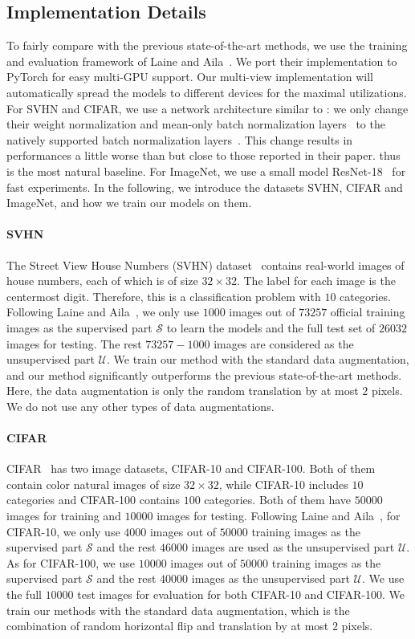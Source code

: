 \documentclass[runningheads]{llncs}
\begin{document}
\subsection{Implementation Details}
To fairly compare with the previous state-of-the-art methods, we use the training and evaluation framework of Laine and Aila~\cite{tessl}.
We port their implementation to PyTorch for easy multi-GPU support.
Our multi-view implementation will automatically spread the models to different devices for the maximal utilizations.
For SVHN and CIFAR, we use a network architecture similar to \cite{tessl}: we only change their weight normalization and mean-only batch normalization layers~\cite{mobn} to the natively supported batch normalization layers~\cite{batchnorm}.
This change results in performances a little worse than but close to those reported in their paper.
\cite{tessl} thus is the most natural baseline.
For ImageNet, we use a small model ResNet-18~\cite{resnet} for fast experiments.
In the following, we introduce the datasets SVHN, CIFAR and ImageNet, and how we train our models on them.

\paragraph{SVHN~}
The Street View House Numbers (SVHN) dataset~\cite{svhn} contains real-world images of house numbers, each of which is of size $32\times 32$.
The label for each image is the centermost digit.
Therefore, this is a classification problem with $10$ categories.
Following Laine and Aila~\cite{tessl}, we only use $1000$ images out of $73257$ official training images as the supervised part $\mathcal{S}$ to learn the models and the full test set of $26032$ images for testing.
The rest $73257 - 1000$ images are considered as the unsupervised part $\mathcal{U}$.
We train our method with the standard data augmentation, and our method significantly outperforms the previous state-of-the-art methods.
Here, the data augmentation is only the random translation by at most $2$ pixels.
We do not use any other types of data augmentations.

\paragraph{CIFAR~}
CIFAR~\cite{cifar} has two image datasets, CIFAR-10 and CIFAR-100.
Both of them contain color natural images of size $32\times32$,
while CIFAR-10 includes $10$ categories and CIFAR-100 contains $100$ categories.
Both of them have $50000$ images for training and $10000$ images for testing.
Following Laine and Aila~\cite{tessl}, for CIFAR-10, we only use $4000$ images out of $50000$ training images as the supervised part $\mathcal{S}$ and the rest $46000$ images are used as the unsupervised part $\mathcal{U}$. As for CIFAR-100, we use $10000$ images out of $50000$ training images as the supervised part $\mathcal{S}$ and the rest $40000$ images as the unsupervised part $\mathcal{U}$.
We use the full $10000$ test images for evaluation for both CIFAR-10 and CIFAR-100.
We train our methods with the standard data augmentation, which is the combination of random horizontal flip and translation by at most $2$ pixels.
\end{document}
